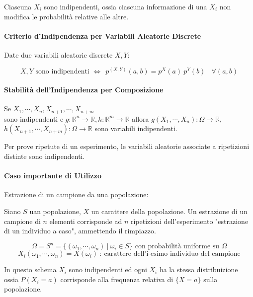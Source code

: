 \documentclass{article}
\begin{document}
Ciascuna $X_{i}$ sono indipendenti, ossia ciascuna informazione di una $X_{i}$ non modifica le probabilità relative alle altre.

\paragraph{Criterio d'Indipendenza per Variabili Aleatorie Discrete} Date due variabili aleatorie discrete $X,Y$:

\[ X,Y \text{ sono indipendenti } \Leftrightarrow \:\:p^{(X,Y)}(a,b) = p^{X}(a) \: p^{Y}(b) \:\:\:\: \forall (a,b) \]

\newpage

\paragraph{Stabilità dell'Indipendenza per Composizione}

Se $X_{1}, \cdots, X_{n}, X_{n+1}, \cdots, X_{n+m} $ \\ sono indipendenti e $g:\mathbb{R}^{n} \rightarrow \mathbb{R}, h:\mathbb{R}^{m} \rightarrow \mathbb{R}$ allora
$g(X_{1}, \cdots, X_{n}): \Omega \rightarrow \mathbb{R}$, \\ $h(X_{n+1}, \cdots, X_{n+m}): \Omega \rightarrow \mathbb{R}$ sono variabili indipendenti. 

Per prove ripetute di un esperimento, le variabili aleatorie associate a ripetizioni distinte sono indipendenti.

\paragraph{Caso importante di Utilizzo} Estrazione di un campione da una popolazione:

Siano $S$ uan popolazione, $X$ un carattere della popolazione. Un estrazione di un campione di $n$ elementi corrisponde ad $n$ ripetizioni dell'esperimento
"estrazione di un individuo a caso", ammettendo il rimpiazzo.

\[ \Omega = S^{n} = \{ (\omega_{1}, \cdots, \omega_{n}) \:|\: \omega_{i} \in S \} \text{ con probabilità uniforme su } \Omega \]
\[ X_{i}(\omega_{1}, \cdots, \omega_{n}) = X(\omega_{i}) \: : \: \text{carattere dell'i-esimo individuo del campione} \]

In questo schema $X_{i}$ sono indipendenti ed ogni $X_{i}$ ha la stessa distribuizione \\ ossia $P(X_{i} = a)$ corrisponde alla frequenza relativa di $\{ X = a \}$ sulla popolazione.
\end{document}
